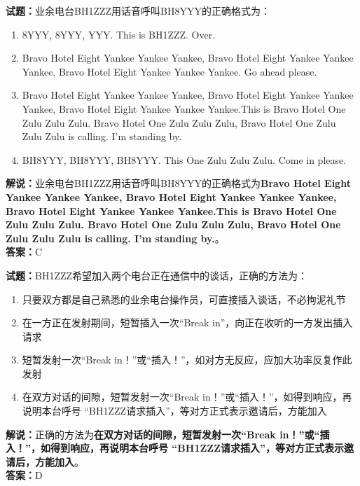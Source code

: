 \documentclass{ctexbook}
\begin{document}
\bigskip


\noindent\textbf{试题：}业余电台BH1ZZZ用话音呼叫BH8YYY的正确格式为：
\begin{enumerate}[leftmargin=3em]
\item 8YYY, 8YYY, YYY. This is BH1ZZZ. Over.
\item Bravo Hotel Eight Yankee Yankee Yankee, Bravo Hotel Eight Yankee Yankee Yankee, Bravo Hotel Eight Yankee Yankee Yankee. Go ahead please.
\item Bravo Hotel Eight Yankee Yankee Yankee, Bravo Hotel Eight Yankee Yankee Yankee, Bravo Hotel Eight Yankee Yankee Yankee.This is Bravo Hotel One Zulu Zulu Zulu. Bravo Hotel One Zulu Zulu Zulu, Bravo Hotel One Zulu Zulu Zulu is calling. I’m standing by.
\item BH8YYY, BH8YYY, BH8YYY. This One Zulu Zulu Zulu. Come in please.
\end{enumerate}
\noindent\textbf{解说：}业余电台BH1ZZZ用话音呼叫BH8YYY的正确格式为\textbf{Bravo Hotel Eight Yankee Yankee Yankee, Bravo Hotel Eight Yankee Yankee Yankee, Bravo Hotel Eight Yankee Yankee Yankee.This is Bravo Hotel One Zulu Zulu Zulu. Bravo Hotel One Zulu Zulu Zulu, Bravo Hotel One Zulu Zulu Zulu is calling. I’m standing by.}。\\\noindent\textbf{答案：}C




\bigskip


\noindent\textbf{试题：}BH1ZZZ希望加入两个电台正在通信中的谈话，正确的方法为：
\begin{enumerate}[leftmargin=3em]
\item 只要双方都是自己熟悉的业余电台操作员，可直接插入谈话，不必拘泥礼节
\item 在一方正在发射期间，短暂插入一次“Break in”，向正在收听的一方发出插入请求
\item 短暂发射一次“Break in！”或“插入！”，如对方无反应，应加大功率反复作此发射
\item 在双方对话的间隙，短暂发射一次“Break in！”或“插入！”，如得到响应，再说明本台呼号 “BH1ZZZ请求插入”，等对方正式表示邀请后，方能加入
\end{enumerate}
\noindent\textbf{解说：}正确的方法为\textbf{在双方对话的间隙，短暂发射一次“Break in！”或“插入！”，如得到响应，再说明本台呼号 “BH1ZZZ请求插入”，等对方正式表示邀请后，方能加入}。\\\noindent\textbf{答案：}D



\bigskip
\end{document}
